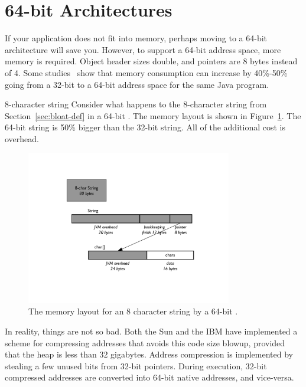 \section{64-bit Architectures}

If your application does not fit into memory, perhaps moving to a 64-bit architecture will save you. However, to support a 64-bit address space, more memory is required. Object header sizes double, and pointers are 8 bytes instead of 4. Some studies~\cite{compressedAddress} show that memory consumption can increase by 40\%-50\% going from a 32-bit to a 64-bit address space for the same Java program.

\begin{example}{8-character string} 
Consider what happens to the 8-character string from
Section~\ref{sec:bloat-def} in a 64-bit \jre. The memory layout is shown in
Figure~\ref{fig:8-char-string-64-bit}. The 64-bit string is 50\% bigger than the 32-bit string. All of the additional cost is overhead.
\end{example}
 
 \begin{figure}
  \centering

 \includegraphics[width=0.8\textwidth]{Figures/chapter4/8-char-string-64-bit.pdf}
  \caption{The memory layout for an 8 character string by a 64-bit \jre.}
  \label{fig:8-char-string-64-bit}
\end{figure}

In reality, things are not so bad. Both the Sun and the IBM \jres have
implemented a scheme for compressing addresses that avoids this code size blowup, provided that the heap is less than 32 gigabytes. Address compression is implemented by stealing a few unused bits from 32-bit pointers. During execution, 32-bit compressed addresses are converted into 64-bit native addresses, and vice-versa.

